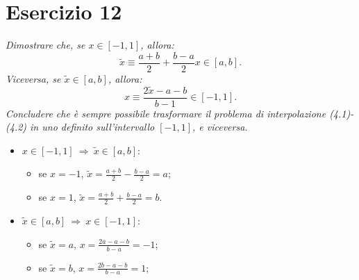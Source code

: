 \section{Esercizio 12}
\label{sub:Esercizio 12}
\emph{Dimostrare che, se $x\in[-1,1]$, allora:
			$$\tilde{x}\equiv\frac{a+b}{2}+\frac{b-a}{2}x\in[a,b].$$
			Viceversa, se $\tilde{x}\in[a,b]$, allora:
			$$x\equiv\frac{2\tilde{x}-a-b}{b-1}\in[-1,1].$$
			Concludere che è sempre possibile trasformare il problema di interpolazione (4.1)-(4.2) in uno definito sull'intervallo $[-1,1]$, e viceversa.
}
\begin{sol}
	\normalfont
	\begin{itemize}
		\item $x\in[-1,1]\:\Rightarrow\:\tilde{x}\in[a,b]$:
	\begin{itemize}
		\item se $x=-1$, $\tilde{x}=\frac{a+b}{2}-\frac{b-a}{2} = a$;
		\item se $x=1$, $\tilde{x}=\frac{a+b}{2}+\frac{b-a}{2} = b$.
	\end{itemize}
		\item $\tilde{x}\in[a,b]\:\Rightarrow\:x\in[-1,1]$:
	\begin{itemize}
		\item se $\tilde{x}=a$, $x=\frac{2a-a-b}{b-a}=-1$;
		\item se $\tilde{x}=b$, $x=\frac{2b-a-b}{b-a}=1$;
	\end{itemize}
	\end{itemize}
\end{sol}


